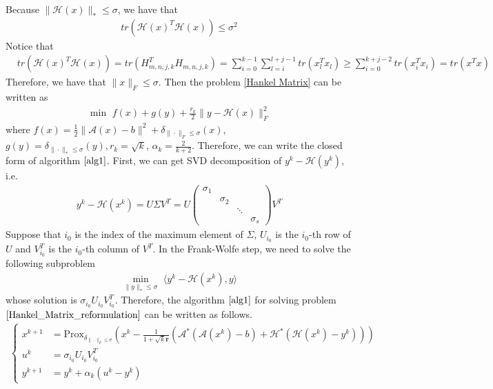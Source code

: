 \documentclass{article}
\numberwithin{equation}{section}
\begin{document}
Because $\|\mathcal{H}(x)\rVert_* \leq \sigma$, we have that
\begin{align}
    tr\left(\mathcal{H}(x)^T\mathcal{H}(x)\right) \leq \sigma^2 \nonumber
\end{align}
Notice that 
\begin{align}
    &tr\left(\mathcal{H}(x)^T\mathcal{H}(x)\right)  = 
    tr\left(H_{m,n,j,k}^T H_{m,n,j,k}\right) =\sum\limits_{i =0}^{k-1}\sum\limits_{l=i}^{l+j-1} 
    tr\left(x_l^Tx_l\right) \geq \sum\limits_{i=0}^{k+j-2} tr\left(x_i^Tx_i\right)
    = tr\left(x^Tx\right) \nonumber
\end{align}
Therefore, we have that $\|x\rVert_F \leq \sigma$.
Then the problem \eqref{Hankel Matrix} can be written as 
\begin{align}\label{Hankel_Matrix_reformulation}
    \min\hspace{4pt} f(x) + g(y) +\frac{r_k}{2}\|y-\mathcal{H}(x) \rVert_F^2 
\end{align}
where $f(x) = \frac{1}{2}\|\mathcal{A}(x)-b\rVert^2 + \delta_{\|\cdot\rVert_F \leq \sigma}(x)$, 
$g(y) = \delta_{\|\cdot\rVert_* \leq \sigma}(y), r_k = \sqrt{k}$, $\alpha_k =\frac{2}{k+2}$.
Therefore, we can write the closed form of algorithm $\ref{alg1}$.
First, we can get SVD decomposition of $y^k - \mathcal{H}(y^k)$, i.e.
\begin{align}
    y^k -\mathcal{H}(x^k) = U\Sigma V^T  = U \left(\begin{array}{cccc}
        \sigma_1 &  & & \\
          &\sigma_2 & & \\
          &   & \ddots & \\
          &   &     &\sigma_s
    \end{array}\right)  V^T \nonumber
\end{align}
Suppose that $i_0$ is the index of the maximum element of $\Sigma$, $U_{i_0}$ is the $i_0$-th row of $U$ and 
$V^T_{i_0}$ is the $i_0$-th column of $V^T$. 
In the Frank-Wolfe step, 
we need  to solve the following subproblem
\begin{align}
    \min\limits_{\|y\rVert_* \leq \sigma} \hspace{4pt} \langle y^k - \mathcal{H}(x^k), y\rangle \nonumber
\end{align}
whose solution is $\sigma_{i_0}U_{i_0}V_{i_0}^T$. Therefore, the algorithm $\ref{alg1}$ for solving 
problem $\eqref{Hankel_Matrix_reformulation}$ can be written as follows. 
\begin{align}
    \left\{
        \begin{aligned}
            x^{k+1} &= \mathrm{Prox}_{\delta_{\|\cdot\rVert_F \leq \sigma}}\left(x^k-\frac{1}{1+\sqrt{k}\mathbf{r}}\left(\mathcal{A^*}\left(\mathcal{A}(x^k)-b\right)
            +\mathcal{H^*}\left(\mathcal{H}(x^k) -y^k\right)\right)\right) \\
            u^k &= \sigma_{i_0}U_{i_0}V_{i_0}^T \\
            y^{k+1} &= y^k+ \alpha_k(u^k-y^k)
        \end{aligned}
     \right.
\end{align}



\end{document}
